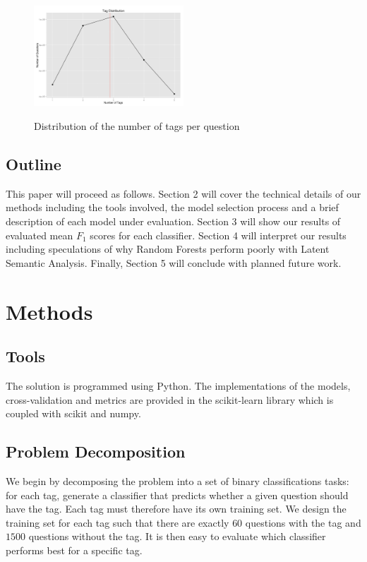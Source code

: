 \documentclass{sig-alternate}
\newcommand{\Fone}{$F_1$}
\begin{document}
		\begin{figure}[htp]
			\centering
			\includegraphics[width=0.5\textwidth]{tag_distribution}
			\label{fig:tag_dist}
			\caption{Distribution of the number of tags per question}
		\end{figure}

	\subsection{Outline} %
	\label{sub:Outline}
		This paper will proceed as follows. Section 2 will cover the technical
		details of our methods including the tools involved, the model
		selection process and a brief description of each model under
		evaluation. Section 3 will show our results of evaluated mean \Fone
		scores for each classifier. Section 4 will interpret our results
		including speculations of why Random Forests perform poorly with Latent
		Semantic Analysis. Finally, Section 5 will conclude with planned future
		work.


\section{Methods} %
\label{sec:Methods}
	\subsection{Tools} %
	\label{sub:Tools}
		The solution is programmed using Python. The implementations of the
		models, cross-validation and metrics are provided in the scikit-learn
		library which is coupled with scikit and numpy.

	\subsection{Problem Decomposition} %
	\label{sub:Problem Decomposition}
		We begin by decomposing the problem into a set of binary
		classifications tasks: for each tag, generate a classifier that
		predicts whether a given question should have the tag. Each tag must
		therefore have its own training set. We design the training set for
		each tag such that there are exactly $60$ questions with the tag and
		$1500$ questions without the tag. It is then easy to evaluate which
		classifier performs best for a specific tag.
\end{document}
